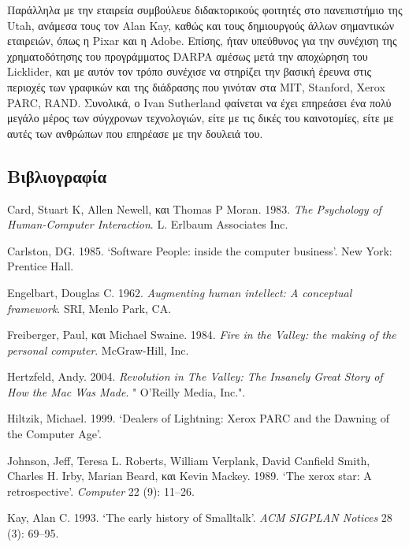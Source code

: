 \documentclass[
]{article}
\newlength{\cslhangindent}
\newlength{\cslentryspacingunit} %
\newenvironment{CSLReferences}[2] %
 {%
  \setlength{\parindent}{0pt}
  \ifodd #1
  \let\oldpar\par
  \def\par{\hangindent=\cslhangindent\oldpar}
  \fi
  \setlength{\parskip}{#2\cslentryspacingunit}
 }%
 {}
\begin{document}
Παράλληλα με την εταιρεία συμβούλευε διδακτορικούς φοιτητές στο
πανεπιστήμιο της Utah, ανάμεσα τους τον Alan Kay, καθώς και τους
δημιουργούς άλλων σημαντικών εταιρειών, όπως η Pixar και η Adobe.
Επίσης, ήταν υπεύθυνος για την συνέχιση της χρηματοδότησης του
προγράμματος DARPA αμέσως μετά την αποχώρηση του Licklider, και με αυτόν
τον τρόπο συνέχισε να στηρίζει την βασική έρευνα στις περιοχές των
γραφικών και της διάδρασης που γινόταν στα MIT, Stanford, Xerox PARC,
RAND. Συνολικά, ο Ivan Sutherland φαίνεται να έχει επηρεάσει ένα πολύ
μεγάλο μέρος των σύγχρονων τεχνολογιών, είτε με τις δικές του
καινοτομίες, είτε με αυτές των ανθρώπων που επηρέασε με την δουλειά του.

\hypertarget{ux3b2ux3b9ux3b2ux3bbux3b9ux3bfux3b3ux3c1ux3b1ux3c6ux3afux3b1}{%
\subsection*{Βιβλιογραφία}\label{ux3b2ux3b9ux3b2ux3bbux3b9ux3bfux3b3ux3c1ux3b1ux3c6ux3afux3b1}}

\hypertarget{refs}{}
\begin{CSLReferences}{0}{0}
\end{CSLReferences}

Card, Stuart K, Allen Newell, και Thomas P Moran. 1983. \emph{The
Psychology of Human-Computer Interaction}. L. Erlbaum Associates Inc.

Carlston, DG. 1985. {`Software People: inside the computer business'}.
New York: Prentice Hall.

Engelbart, Douglas C. 1962. \emph{Augmenting human intellect: A
conceptual framework}. SRI, Menlo Park, CA.

Freiberger, Paul, και Michael Swaine. 1984. \emph{Fire in the Valley:
the making of the personal computer}. McGraw-Hill, Inc.

Hertzfeld, Andy. 2004. \emph{Revolution in The Valley: The Insanely
Great Story of How the Mac Was Made}. " O'Reilly Media, Inc.".

Hiltzik, Michael. 1999. {`Dealers of Lightning: Xerox PARC and the
Dawning of the Computer Age'}.

Johnson, Jeff, Teresa L. Roberts, William Verplank, David Canfield
Smith, Charles H. Irby, Marian Beard, και Kevin Mackey. 1989. {`The
xerox star: A retrospective'}. \emph{Computer} 22 (9): 11--26.

Kay, Alan C. 1993. {`The early history of Smalltalk'}. \emph{ACM SIGPLAN
Notices} 28 (3): 69--95.
\end{document}
